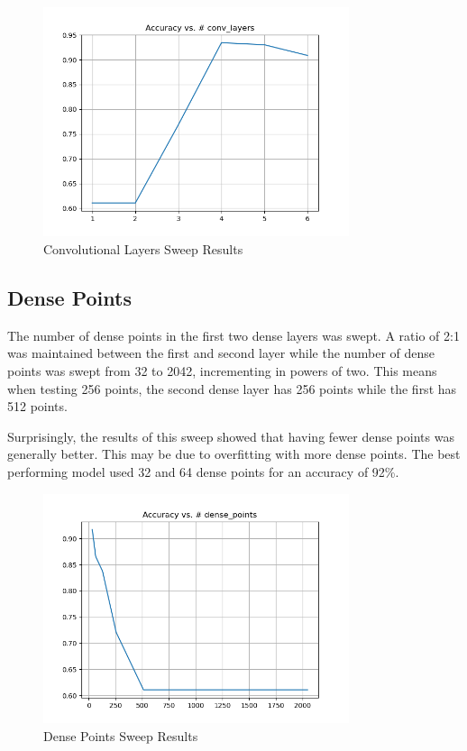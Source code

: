 \documentclass{article}
\begin{document}
\begin{figure}[H]
    \centering
    \includegraphics[width=0.8\textwidth]{../media/conv_layers_sweep.png}
    \caption{Convolutional Layers Sweep Results}
    \label{fig:conv}
\end{figure}


\subsection{Dense Points}

The number of dense points in the first two dense layers was swept. A ratio of 2:1 was maintained between the first and second layer  while the number of dense points was swept from 32 to 2042, incrementing in powers of two. This means when testing 256 points, the second dense layer has 256 points while the first has 512 points. 

Surprisingly, the results of this sweep showed that having fewer dense points was generally better. This may be due to overfitting with more dense points. The best performing model used 32 and 64 dense points for an accuracy of 92\%. 

\begin{figure}[H]
    \centering
    \includegraphics[width=0.8\textwidth]{../media/dense_points_sweep.png}
    \caption{Dense Points Sweep Results}
    \label{fig:dense}
\end{figure}
\end{document}
